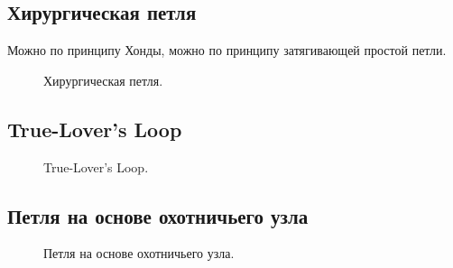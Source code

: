 \subsection{Хирургическая петля}

Можно по принципу Хонды, можно по принципу затягивающей простой петли.

\begin{figure}[H]\centering
\end{figure}

\begin{figure}[H]\centering
	\caption{Хирургическая петля.}\label{ris:Hirurg_loop}
\end{figure}

\subsection{True-Lover’s Loop}

\begin{figure}[H]\centering
	\begin{minipage}{1\linewidth}
		\begin{center}
			\tcbox[enhanced jigsaw,colframe=black,opacityframe=0.5,opacityback=0.5]
			{\centering{}}
		\end{center}
	\end{minipage}
\caption{True-Lover’s Loop.}
\label{ris:True-Lover_Loop}
\end{figure}

\subsection{Петля на основе охотничьего узла}

\begin{figure}[H]\centering
	\begin{minipage}{1\linewidth}
		\begin{center}
			\tcbox[enhanced jigsaw,colframe=black,opacityframe=0.5,opacityback=0.5]
			{\centering{}}
		\end{center}
	\end{minipage}
\caption{Петля на основе охотничьего узла.}
\label{ris:Hanter_loop}
\end{figure}

